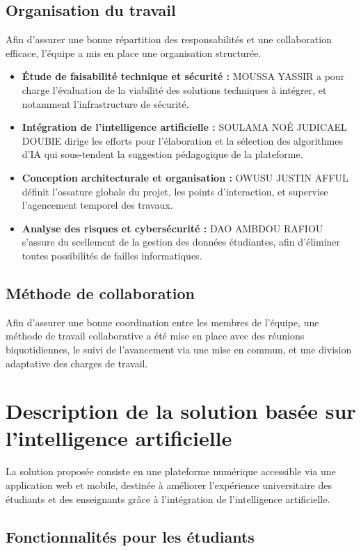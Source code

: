 \documentclass[12pt,a4paper]{report}
\begin{document}
\section{Organisation du travail}
Afin d'assurer une bonne répartition des responsabilités et une collaboration efficace, l'équipe a mis en place une organisation structurée.

\begin{itemize}
    \item \textbf{Étude de faisabilité technique et sécurité :} MOUSSA YASSIR a pour charge l'évaluation de la viabilité des solutions techniques à intégrer, et notamment l'infrastructure de sécurité.
    \item \textbf{Intégration de l'intelligence artificielle :} SOULAMA NOÉ JUDICAEL DOUBIE dirige les efforts pour l'élaboration et la sélection des algorithmes d'IA qui sous-tendent la suggestion pédagogique de la plateforme.
    \item \textbf{Conception architecturale et organisation :} OWUSU JUSTIN AFFUL définit l'ossature globale du projet, les points d'interaction, et supervise l'agencement temporel des travaux.
    \item \textbf{Analyse des risques et cybersécurité :} DAO AMBDOU RAFIOU s'assure du scellement de la gestion des données étudiantes, afin d'éliminer toutes possibilités de failles informatiques.
\end{itemize}

\section{Méthode de collaboration}
Afin d'assurer une bonne coordination entre les membres de l'équipe, une méthode de travail collaborative a été mise en place avec des réunions biquotidiennes, le suivi de l'avancement via une mise en commun, et une division adaptative des charges de travail.


\chapter{Description de la solution basée sur l'intelligence artificielle}
La solution proposée consiste en une plateforme numérique accessible via une application web et mobile, destinée à améliorer l'expérience universitaire des étudiants et des enseignants grâce à l'intégration de l'intelligence artificielle.

\section{Fonctionnalités pour les étudiants}
\end{document}

